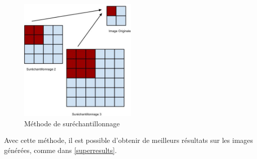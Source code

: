 \documentclass{article}
\begin{document}
\begin{figure}
  \begin{center}
  \includegraphics[width=0.5\textwidth]{images/supersampling.jpg}
  \end{center}
  \caption{Méthode de suréchantillonnage\label{super}}
\end{figure}

Avec cette méthode, il est possible d'obtenir de meilleurs résultats sur les
images générées, comme dans \cref{superresults}.
\end{document}
